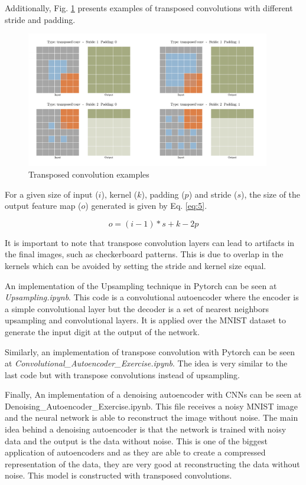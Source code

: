 \documentclass{article}
\begin{document}
Additionally, Fig. \ref{fig:f8} presents examples of transposed convolutions with different stride and padding.

\begin{figure}[ht]
    \centering
    \includegraphics[width=0.95\textwidth,height=0.95\textheight,keepaspectratio]{images/multiple_convs.png}
    \captionsetup{justification=centering}
    \caption{Transposed convolution examples}
    \label{fig:f8}
\end{figure}

For a given size of input (\(i\)), kernel (\(k\)), padding (\(p\)) and stride (\(s\)), the size of the output feature map (\(o\)) generated is given by  Eq. \eqref{eq:5}.

\begin{equation}
o = (i - 1) * s + k - 2p
\label{eq:5}
\end{equation}

It is important to note that transpose convolution layers can lead to artifacts in the final images, such as checkerboard patterns. This is due to overlap in the kernels which can be avoided by setting the stride and kernel size equal.

An implementation of the Upsampling technique in Pytorch can be seen at \textit{Upsampling.ipynb}. This code is a convolutional autoencoder where the encoder is a simple convolutional layer but the decoder is a set of nearest neighbors upsampling and convolutional layers. It is applied over the MNIST dataset to generate the input digit at the output of the network.

Similarly, an implementation of transpose convolution with Pytorch can be seen at \textit{Convolutional\_Autoencoder\_Exercise.ipynb}. The idea is very similar to the last code but with transpose convolutions instead of upsampling.

Finally, An implementation of a denoising autoencoder with CNNs can be seen at Denoising\_Autoencoder\_Exercise.ipynb. This file receives a noisy MNIST image and the neural network is able to reconstruct the image without noise. The main idea behind a denoising autoencoder is that the network is trained with noisy data and the output is the data without noise. This is one of the biggest application of autoencoders and as they are able to create a compressed representation of the data, they are very good at reconstructing the data without noise. This model is constructed with transposed convolutions.
\end{document}
